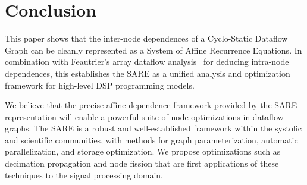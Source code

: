 \section{Conclusion}

This paper shows that the inter-node dependences of a Cyclo-Static
Dataflow Graph can be cleanly represented as a System of Affine
Recurrence Equations.  In combination with Feautrier's array dataflow
analysis~\cite{Feautrier01} for deducing intra-node dependences, this
establishes the SARE as a unified analysis and optimization framework
for high-level DSP programming models.

We believe that the precise affine dependence framework provided by
the SARE representation will enable a powerful suite of node
optimizations in dataflow graphs.  The SARE is a robust and
well-established framework within the systolic and scientific
communities, with methods for graph parameterization, automatic
parallelization, and storage optimization.  We propose optimizations
such as decimation propagation and node fission that are first
applications of these techniques to the signal processing domain.
